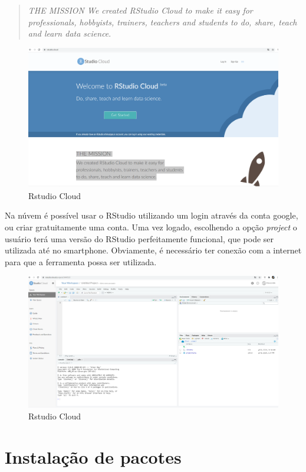 \documentclass[
]{book}
\begin{document}
\begin{quote}
\emph{THE MISSION
We created RStudio Cloud to make it easy for professionals, hobbyists, trainers, teachers and students to do, share, teach and learn data science}. \citep{rstudiocloud}
\end{quote}

\begin{figure}
\includegraphics[width=0.9\linewidth]{Figuras/RStudioCloud} \caption{Rstudio Cloud}\label{fig:rstudiocloud}
\end{figure}

Na núvem é possível usar o RStudio utilizando um login através da conta google, ou criar gratuitamente uma conta. Uma vez logado, escolhendo a opção \emph{project} o usuário terá uma versão do RStudio perfeitamente funcional, que pode ser utilizada até no smartphone. Obviamente, é necessário ter conexão com a internet para que a ferramenta possa ser utilizada.

\begin{figure}
\includegraphics[width=0.9\linewidth]{Figuras/RStudioCloud2} \caption{Rstudio Cloud}\label{fig:rstudiocloud2}
\end{figure}

\hypertarget{instalauxe7uxe3o-de-pacotes}{%
\section{Instalação de pacotes}\label{instalauxe7uxe3o-de-pacotes}}
\end{document}
